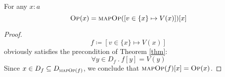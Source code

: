 \begin{corollary}
For any $x\colon a$
\[
\textsc{Op}(x) = \textsc{mapOp}([ v \in \{x\} \mapsto V(x) ])[x]
\]
\end{corollary}
\begin{proof}
\[
f \coloneqq [ v \in \{x\} \mapsto V(x) ]
\]
obviously satisfies the precondition of Theorem \ref{thm}:
\[
\forall y \in D_f \ .\ f[y] = V(y)
\]
Since $x \in D_f \subseteq D_{\textsc{mapOp}(f)}$, we conclude that $\textsc{mapOp}(f)[x] = \textsc{Op}(x)$.
\end{proof}

